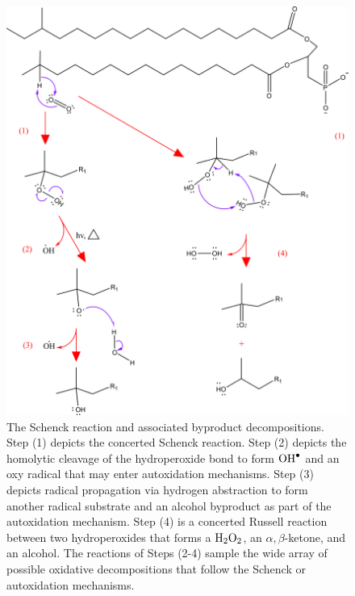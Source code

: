 \begin{figure}[t]
    \centering
    \includegraphics[width =0.9 \textwidth]{images/PDIpy/background/BCFA_schenck_oxidation_2.png}
    \caption{
         The Schenck reaction and associated byproduct decompositions. Step (1) depicts the concerted\cite{Foote1968PhotosensitizedOxygen} Schenck reaction. Step (2) depicts the homolytic cleavage of the hydroperoxide bond to form $\ce{OH^.}$ and an oxy radical that may enter autoxidation mechanisms. Step (3) depicts radical propagation via hydrogen abstraction to form another radical substrate and an alcohol byproduct as part of the autoxidation mechanism. Step (4) is a concerted Russell reaction\cite{Russell1957Deuterium-isotopeRadicals,Howard1968TheMechanism} between two hydroperoxides that forms a $\ce{H2O2}$, an $\alpha,\beta$-ketone, and an alcohol. The reactions of Steps (2-4) sample the wide array of possible oxidative decompositions that follow the Schenck or autoxidation mechanisms.
    }
    \label{schenck_mechanism}
\end{figure}

